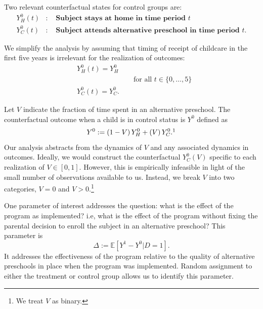 Two relevant counterfactual states for control groups are:
\begin{eqnarray}
Y_H^0\left(t \right) &:& \textbf{ Subject stays at home in time period $t$} \nonumber \\
Y_C^0\left(t \right) &:& \textbf{ Subject attends alternative preschool in time period $t$}.  \nonumber
\end{eqnarray}

We simplify the analysis by assuming that timing of receipt of childcare in the first five years is irrelevant for the realization of outcomes:
\begin{align}
&Y_H^0 \left( t \right)= Y_H^0  \\
&\qquad \qquad \qquad \qquad \text{for all } t\in\{0,\dots,5\} \nonumber\\
&Y_C^0 \left( t \right) = Y_C^0.
\end{align}

Let $V$ indicate the fraction of time spent in an alternative preschool. The counterfactual outcome when a child is in control status is $Y^0$ defined as
\begin{equation}
Y^0 : = \left( 1 - V \right) Y_H^0 + \left( V \right) Y_C^0.\footnotemark
\end{equation}
Our analysis abstracts from the dynamics of $V$ and any associated dynamics in outcomes. Ideally, we would construct the counterfactual $Y_C^0 \left( V \right)$ specific to each realization of $V \in [0,1]$. However, this is empirically infeasible in light of the small number of observations available to us. Instead, we break $V$ into two categories, $V=0$ and $V>0$.\footnote{We treat $V$ as binary.}

One parameter of interest addresses the question: what is the effect of the program as implemented? i.e, what is the effect of the program without fixing the parental decision to enroll the subject in an alternative preschool? This parameter is
\begin{equation}\label{eq:effect}
\Delta := \mathbb{E} \left[ Y^1 -  Y^0 | D =1 \right].
\end{equation}
It addresses the effectiveness of the program relative to the quality of alternative preschools in place when the program was implemented. Random assignment to either the treatment or control group allows us to identify this parameter.


